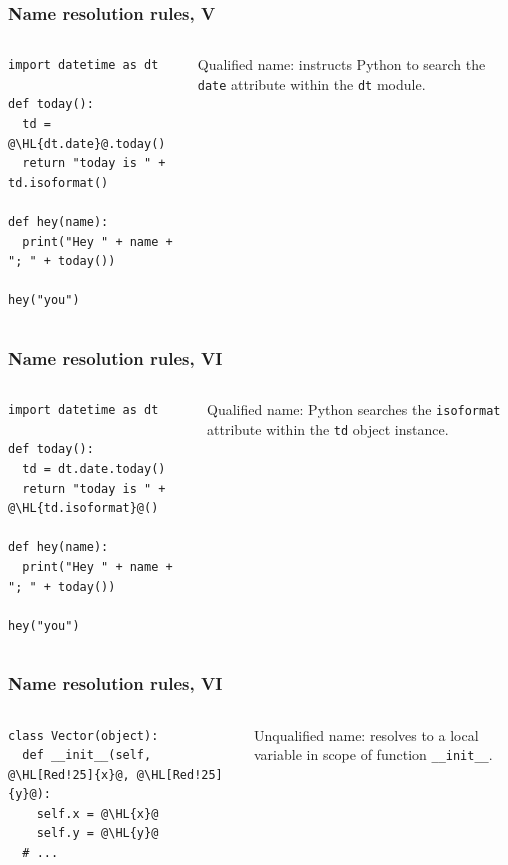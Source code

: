 \documentclass[english,serif,mathserif,xcolor=pdftex,dvipsnames,table]{beamer}
\begin{document}
\begin{frame}[fragile]
  \frametitle{Name resolution rules, V}
  \begin{columns}
    \begin{column}[t]{0.6\linewidth}
\begin{lstlisting}
import datetime as dt

def today():
  td = @\HL{dt.date}@.today()
  return "today is " + td.isoformat()

def hey(name):
  print("Hey " + name + "; " + today())

hey("you")
\end{lstlisting}
    \end{column}
    \begin{column}[t]{0.4\linewidth}
      \raggedleft
      Qualified name: instructs Python to search the
      \texttt{date} attribute within the \texttt{dt} module.
    \end{column}
  \end{columns}
\end{frame}


\begin{frame}[fragile]
  \frametitle{Name resolution rules, VI}
  \begin{columns}
    \begin{column}[t]{0.6\linewidth}
\begin{lstlisting}
import datetime as dt

def today():
  td = dt.date.today()
  return "today is " + @\HL{td.isoformat}@()

def hey(name):
  print("Hey " + name + "; " + today())

hey("you")
\end{lstlisting}
    \end{column}
    \begin{column}[t]{0.4\linewidth}
      \raggedleft
      Qualified name: Python searches the \texttt{isoformat} attribute
      within the \texttt{td} object instance.
    \end{column}
  \end{columns}
\end{frame}


\begin{frame}[fragile]
  \frametitle{Name resolution rules, VI}
  \begin{columns}
    \begin{column}[t]{0.6\linewidth}
\begin{lstlisting}
class Vector(object):
  def __init__(self, @\HL[Red!25]{x}@, @\HL[Red!25]{y}@):
    self.x = @\HL{x}@
    self.y = @\HL{y}@
  # ...
\end{lstlisting}
    \end{column}
    \begin{column}[t]{0.4\linewidth}
      \raggedleft
      Unqualified name: resolves to a local variable in
      scope of function \lstinline|__init__|.
    \end{column}
  \end{columns}
\end{frame}
\end{document}
